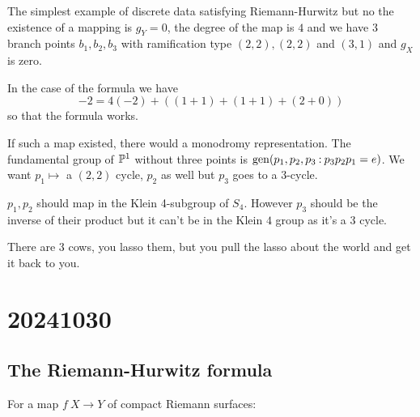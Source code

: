 \documentclass[12pt]{memoir}
\begin{document}
 \begin{Ex}
    The simplest example of discrete data satisfying Riemann-Hurwitz but no the existence of a mapping is $g_Y=0$, the degree of the map is $4$ and we have $3$ branch points $b_1,b_2,b_3$ with ramification type $(2,2),(2,2)$ and $(3,1)$ and $g_X$ is zero.\par
    In the case of the formula we have 
    $$-2=4(-2)+((1+1)+(1+1)+(2+0))$$
    so that the formula works.\par
    If such a map existed, there would a monodromy representation. The fundamental group of $\mathbb{P}^1$ without three points is $\operatorname{gen}(p_1,p_2,p_3\mathbin{:} p_3p_2p_1=e)$. We want $p_1\mapsto$ a $(2,2)$ cycle, $p_2$ as well but $p_3$ goes to a $3$-cycle.\par
    $p_1,p_2$ should map in the Klein 4-subgroup of $S_4$. However $p_3$ should be the inverse of their product but it can't be in the Klein $4$ group as it's a 3 cycle.
 \end{Ex}

 \begin{Rmk}
    There are 3 cows, you lasso them, but you pull the lasso about the world and get it back to you.
 \end{Rmk}

\section{20241030}

\subsection{The Riemann-Hurwitz formula}

For a map $f\: X\to Y$ of compact Riemann surfaces:
\end{document}
